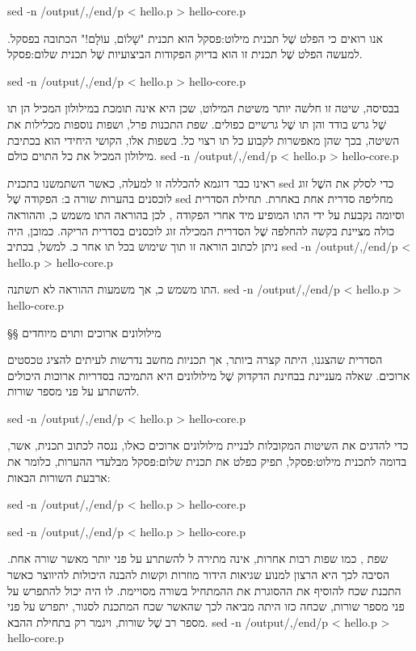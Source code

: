 \begin{טבלא}[!htbp]
\bash
sed -n /output/,/end/p < hello.p > hello-core.p
\END

אנו רואים כי הפלט שֶׁל  תכנית מילוט:פסקל הוא תכנית "שָׁלוֹם, עוֹלָם!" הכתובה
בפסקל. למעשה הפלט שֶׁל תכנית זו הוא בדיוק הפקודות הביצועיות שֶׁל  תכנית
שלום:פסקל.

\bash
sed -n /output/,/end/p < hello.p > hello-core.p
\END

בבסיסה, שיטה זו חלשה יותר משיטת המילוט, שכן היא אינה תומכת במילולון המכיל הן
תו שֶׁל גרש בודד והן תו שֶׁל גרשיים כפולים. שפת התכנות פרל, ושפות נוספות מכלילות
את השיטה, בכך שהן מאפשרות לקבוע כל תו רצוי כ ל. בשפות אלו, הקושי
היחידי הוא בכתיבת מילולון המכיל את כל התוים כולם.
\bash
sed -n /output/,/end/p < hello.p > hello-core.p
\END

ראינו כבר דוגמא להכללה זו למעלה, כאשר השתמשנו בתכנית sed כדי לסלק
את ה שֶׁל זוג לוכסנים בהערות שורה ב:
הפקודה  שֶׁל sed מחליפה סדרית אחת באחרת. תחילת הסדרית וסיומה נקבעת על
ידי התו המופיע מיד אחרי הפקודה , לכן בהוראה  התו
 משמש כ, וההוראה כולה מציינת בקשה להחלפה שֶׁל הסדרית המכילה זוג
לוכסנים בסדרית הריקה. כמובן, היה ניתן לכתוב הוראה זו תוך שימוש בכל תו אחר
כ. למשל, בכתיב
\bash
sed -n /output/,/end/p < hello.p > hello-core.p
\END

התו  משמש כ, אך משמעות ההוראה לא תשתנה.
\bash
sed -n /output/,/end/p < hello.p > hello-core.p
\END

§§ מילולונים ארוכים ותוים מיוחדים

הסדרית  שהצגנו, היתה קצרה ביותר, אך תכניות מחשב נדרשות
לעיתים להציג טכסטים ארוכים. שאלה מעניינת בבחינת הדקדוק שֶׁל מילולונים היא התמיכה
בסדריות ארוכות היכולים להשתרע על פני מספר שורות.

\bash
sed -n /output/,/end/p < hello.p > hello-core.p
\END

כדי להדגים את השיטות המקובלות לבניית מילולונים ארוכים כאלו, ננסה לכתוב תכנית,
אשר, בדומה ל תכנית מילוט:פסקל, תפיק כפלט את  תכנית שלום:פסקל מבלעדי
ההערות, כלומר את ארבעת השורות הבאות:

\bash
sed -n /output/,/end/p < hello.p > hello-core.p
\END


\bash
sed -n /output/,/end/p < hello.p > hello-core.p
\END

שפת , כמו שפות רבות אחרות, אינה מתירה ל  להשתרע על פני
יותר מאשר שורה אחת. הסיבה לכך היא הרצון למנוע שגיאות הידור מוזרות וקשות להבנה
היכולות להיווצר כאשר התכנת שכח להוסיף את ה הסוגרת את ה המתחיל
בשורה מסויימת. לו היה  יכול להתפרש על פני מספר שורות, שכחה כזו
היתה מביאה לכך שה אשר שכח המתכנת לסגור, יתפרש על פני מספר רב שֶׁל שורות,
ויגמר רק בתחילת ה הבא.
\bash
sed -n /output/,/end/p < hello.p > hello-core.p
\END


\end{טבלא}
